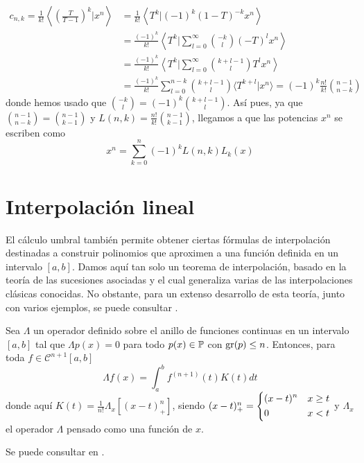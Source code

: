 \begin{ej}
\begin{enumerate}
        \begin{align*}
            c_{n,k} = \frac{1}{k!} \left\langle \left(\frac{T}{T-1}\right)^k | x^n \right\rangle & = \frac{1}{k!} \left \langle T^k | (-1)^k (1-T)^{-k} x^n \right \rangle \\
            & = \frac{(-1)^k}{k!} \left\langle T^k | \sum_{l=0}^\infty \binom{-k}{l} (-T)^l x^n \right\rangle \\
            & = \frac{(-1)^k}{k!} \left\langle T^k | \sum_{l=0}^\infty \binom{k + l -1}{l} T^l x^n \right\rangle \\
            & = \frac{(-1)^k}{k!} \sum_{l=0}^{n-k} \binom{k + l -1}{l}\langle T^{k+l} | x^n \rangle = (-1)^k \frac{n!}{k!} \binom{n-1}{n-k}
        \end{align*}
        donde hemos usado que $\binom{-k}{l} = (-1)^k \binom{k + l -1}{l}$. Así pues, ya que $\binom{n-1}{n-k} = \binom{n-1}{k-1}$ y $L(n,k) = \frac{n!}{k!} \binom{n-1}{k-1}$, llegamos a que las potencias $x^n$ se escriben como
        \begin{equation*}
            x^n = \sum_{k=0}^{n} (-1)^k L(n,k) L_k(x)
        \end{equation*}
    \end{enumerate}
\end{ej}


\section{Interpolación lineal}

El cálculo umbral también permite obtener ciertas fórmulas de interpolación destinadas a construir polinomios que aproximen a una función definida en un intervalo $[a,b]$. Damos aquí tan solo un teorema de interpolación, basado en la teoría de las sucesiones asociadas y el cual generaliza varias de las interpolaciones clásicas conocidas. No obstante, para un extenso desarrollo de esta teoría, junto con varios ejemplos, se puede consultar \cite{costabile}. 

\begin{lema}[de Peano]
    Sea $\Lambda$ un operador definido sobre el anillo de funciones continuas en un intervalo $[a,b]$ tal que $\Lambda p(x) = 0$ para todo $p(x) \in \mathbb{P}$ con $\operatorname{gr}(p) \leq n$. Entonces, para toda $f \in \mathcal{C}^{n+1}[a,b]$
    \begin{equation*}
        \Lambda f(x) = \int_{a}^{b} f^{(n+1)}(t)K(t) dt
    \end{equation*}
    donde aquí $K(t) = \frac{1}{n!}\Lambda_x [(x-t)_{+}^n]$, siendo $(x-t)_{+}^n = \begin{dcases}
            (x-t)^n & x \geq t \\
            0 & x < t
    \end{dcases}$
    y $\Lambda_x$ el operador $\Lambda$ pensado como una función de $x$. 
\end{lema}
\begin{demo}
    Se puede consultar en \cite{davis}.
\end{demo}

